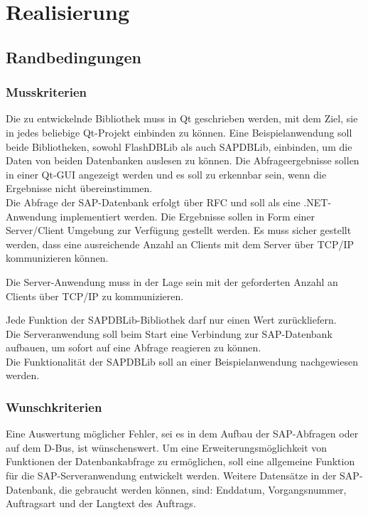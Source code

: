 \chapter{Realisierung}
\section{Randbedingungen}

\subsection{Musskriterien}
Die zu entwickelnde Bibliothek muss in Qt geschrieben werden, mit dem Ziel, sie in jedes beliebige Qt-Projekt einbinden zu können. Eine Beispielanwendung soll beide Bibliotheken, sowohl FlashDBLib als auch SAPDBLib, einbinden, um die Daten von beiden Datenbanken auslesen zu können. Die Abfrageergebnisse sollen in einer Qt-GUI angezeigt werden und es soll zu erkennbar sein, wenn die Ergebnisse nicht übereinstimmen.\\
Die Abfrage der SAP-Datenbank erfolgt über \acl{RFC} und soll als eine .NET-Anwendung implementiert werden. Die Ergebnisse sollen in Form einer Server/Client Umgebung zur Verfügung gestellt werden. Es muss sicher gestellt werden, dass eine ausreichende Anzahl an Clients mit dem Server über TCP/IP kommunizieren können. 

Die Server-Anwendung muss in der Lage sein mit der geforderten Anzahl an Clients über TCP/IP zu kommunizieren.

Jede Funktion der SAPDBLib-Bibliothek darf nur einen Wert zurückliefern. \\
Die Serveranwendung soll beim Start eine Verbindung zur SAP-Datenbank aufbauen, um sofort auf eine Abfrage reagieren zu können.\\
Die Funktionalität der SAPDBLib soll an einer Beispielanwendung nachgewiesen werden.

\subsection{Wunschkriterien}
Eine Auswertung möglicher Fehler, sei es in dem Aufbau der SAP-Abfragen oder auf dem D-Bus, ist wünschenswert. Um eine Erweiterungsmöglichkeit von Funktionen der Datenbankabfrage zu ermöglichen, soll eine allgemeine Funktion für die SAP-Serveranwendung entwickelt werden. Weitere Datensätze in der SAP-Datenbank, die gebraucht werden können, sind: Enddatum, Vorgangsnummer, Auftragsart und der Langtext des Auftrags.

